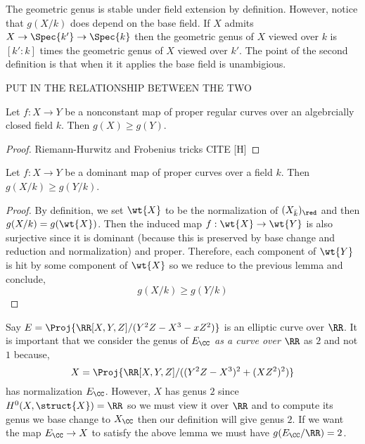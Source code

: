 \documentclass[12pt]{article}
\begin{document}
\begin{rmk}
The geometric genus is stable under field extension by definition. However, notice that $g(X/k)$ does depend on the base field. If $X$ admits $X \to \Spec{k'} \to \Spec{k}$ then the geometric genus of $X$ viewed over $k$ is $[k' : k]$ times the geometric genus of $X$ viewed over $k'$. The point of the second definition is that when it it applies the base field is unambigious.
\end{rmk}

PUT IN THE RELATIONSHIP BETWEEN THE TWO

\begin{lemma}
Let $f : X \to Y$ be a nonconstant map of proper regular curves over an algebrcially closed field $k$. Then $g(X) \ge g(Y)$.
\end{lemma}

\begin{proof}
Riemann-Hurwitz and Frobenius tricks CITE [H]
\end{proof}

\begin{prop}
Let $f : X \to Y$ be a dominant map of proper curves over a field $k$. Then $g(X/k) \ge g(Y/k)$.
\end{prop}

\begin{proof}
By definition, we set $\wt{X}$ to be the normalization of $(X_{\bar{k}})_{\red}$ and then $g(X/k) = g(\wt{X})$. Then the induced map $f : \wt{X} \to \wt{Y}$ is also surjective since it is dominant (because this is preserved by base change and reduction and normalization) and proper. Therefore, each component of $\wt{Y}$ is hit by some component of $\wt{X}$ so we reduce to the previous lemma and conclude,
\[ g(X/k) \ge g(Y/k) \]
\end{proof}

\begin{example}
Say $E = \Proj{\RR[X,Y,Z]/(Y^2 Z - X^3 - x Z^2)}$ is an elliptic curve over $\RR$. It is important that we consider the genus of $E_{\CC}$ \textit{as a curve over $\RR$} as $2$ and not $1$ because,
\[ X = \Proj{\RR[X,Y,Z]/((Y^2 Z - X^3)^2 + (XZ^2)^2)} \]
has normalization $E_{\CC}$. However, $X$ has genus $2$ since $H^0(X, \struct{X}) = \RR$ so we must view it over $\RR$ and to compute its genus we base change to $X_{\CC}$ then our definition will give genus $2$. If we want the map $E_{\CC} \to X$ to satisfy the above lemma we must have $g(E_{\CC} / \RR) = 2$. 
\end{example}
\end{document}
